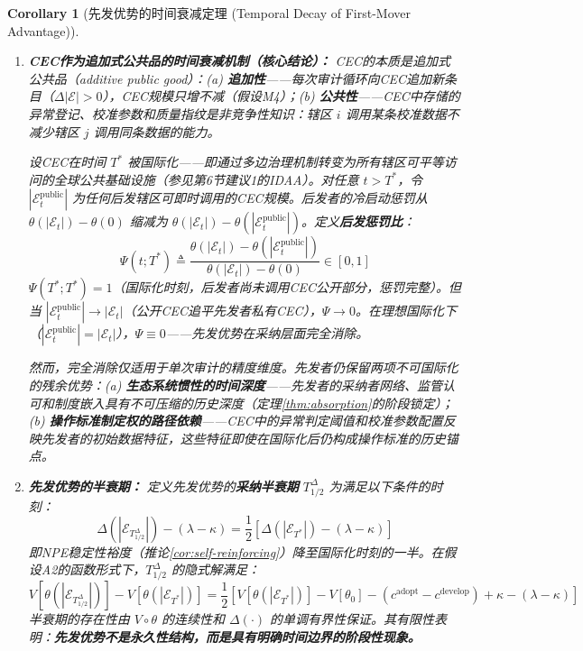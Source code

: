 \documentclass[12pt,a4paper]{ctexart}
\newtheorem{corollary}[theorem]{Corollary}
\theoremstyle{definition}
\theoremstyle{remark}
\begin{document}
\begin{corollary}[先发优势的时间衰减定理 (Temporal Decay of First-Mover Advantage)]
\begin{enumerate}[label=(\roman*), itemsep=6pt]
\item \textbf{CEC作为追加式公共品的时间衰减机制（核心结论）：} CEC的本质是\textit{追加式公共品}（additive public good）：(a) \textbf{追加性}——每次审计循环向CEC追加新条目（$\Delta |\mathcal{E}| > 0$），CEC规模只增不减（假设M4）；(b) \textbf{公共性}——CEC中存储的异常登记、校准参数和质量指纹是\textit{非竞争性}知识：辖区 $i$ 调用某条校准数据不减少辖区 $j$ 调用同条数据的能力。

设CEC在时间 $T^*$ 被国际化——即通过多边治理机制转变为所有辖区可平等访问的全球公共基础设施（参见第6节建议1的IDAA）。对任意 $t > T^*$，令 $|\mathcal{E}_t^{\text{public}}|$ 为任何后发辖区可即时调用的CEC规模。后发者的冷启动惩罚从 $\theta(|\mathcal{E}_t|) - \theta(0)$ 缩减为 $\theta(|\mathcal{E}_t|) - \theta(|\mathcal{E}_t^{\text{public}}|)$。定义\textbf{后发惩罚比}：
\begin{equation}
\Psi(t; T^*) \triangleq \frac{\theta(|\mathcal{E}_t|) - \theta(|\mathcal{E}_t^{\text{public}}|)}{\theta(|\mathcal{E}_t|) - \theta(0)} \in [0, 1]
\end{equation}
$\Psi(T^*; T^*) = 1$（国际化时刻，后发者尚未调用CEC公开部分，惩罚完整）。但当 $|\mathcal{E}_t^{\text{public}}| \to |\mathcal{E}_t|$（公开CEC追平先发者私有CEC），$\Psi \to 0$。在理想国际化下（$|\mathcal{E}_t^{\text{public}}| = |\mathcal{E}_t|$），$\Psi \equiv 0$——先发优势在采纳层面完全消除。

然而，完全消除仅适用于单次审计的精度维度。先发者仍保留两项\textit{不可国际化}的残余优势：(a) \textbf{生态系统惯性的时间深度}——先发者的采纳者网络、监管认可和制度嵌入具有不可压缩的历史深度（定理\ref{thm:absorption}的阶段锁定）；(b) \textbf{操作标准制定权的路径依赖}——CEC中的异常判定阈值和校准参数配置反映先发者的初始数据特征，这些特征即使在国际化后仍构成操作标准的历史锚点。

\item \textbf{先发优势的半衰期：} 定义先发优势的\textbf{采纳半衰期} $T_{1/2}^{\Delta}$ 为满足以下条件的时刻：
\begin{equation}
\Delta(|\mathcal{E}_{T_{1/2}^{\Delta}}|) - (\lambda - \kappa) = \frac{1}{2}\left[\Delta(|\mathcal{E}_{T^*}|) - (\lambda - \kappa)\right]
\end{equation}
即NPE稳定性裕度（推论\ref{cor:self-reinforcing}）降至国际化时刻的一半。在假设A2的函数形式下，$T_{1/2}^{\Delta}$ 的隐式解满足：
\begin{equation}
V[\theta(|\mathcal{E}_{T_{1/2}^{\Delta}}|)] - V[\theta(|\mathcal{E}_{T^*}|)] = \frac{1}{2}\left[V[\theta(|\mathcal{E}_{T^*}|)] - V[\theta_0] - (c^{\text{adopt}} - c^{\text{develop}}) + \kappa - (\lambda - \kappa)\right]
\end{equation}
半衰期的存在性由 $V \circ \theta$ 的连续性和 $\Delta(\cdot)$ 的单调有界性保证。其有限性表明：\textbf{先发优势不是永久性结构，而是具有明确时间边界的阶段性现象。}


\end{enumerate}
\end{corollary}
\end{document}
